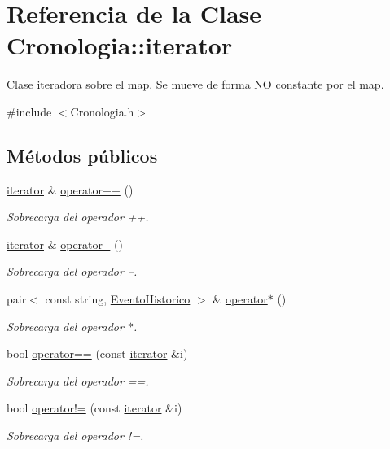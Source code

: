 \hypertarget{classCronologia_1_1iterator}{}\section{Referencia de la Clase Cronologia\+:\+:iterator}
\label{classCronologia_1_1iterator}


Clase iteradora sobre el map. Se mueve de forma NO constante por el map.  




{\ttfamily \#include $<$Cronologia.\+h$>$}

\subsection*{Métodos públicos}
\begin{DoxyCompactItemize}
\item 
\hyperlink{classCronologia_1_1iterator}{iterator} \& \hyperlink{classCronologia_1_1iterator_a706bd624956361f8197c716488b3f287}{operator++} ()
\begin{DoxyCompactList}\small\item\em Sobrecarga del operador ++. \end{DoxyCompactList}\item 
\hyperlink{classCronologia_1_1iterator}{iterator} \& \hyperlink{classCronologia_1_1iterator_af80e6a7382b8c7324df4394a7fe82eda}{operator-\/-\/} ()
\begin{DoxyCompactList}\small\item\em Sobrecarga del operador --. \end{DoxyCompactList}\item 
pair$<$ const string, \hyperlink{classEventoHistorico}{Evento\+Historico} $>$ \& \hyperlink{classCronologia_1_1iterator_a63b19e3195e5344767a4ba679ff83d83}{operator$\ast$} ()
\begin{DoxyCompactList}\small\item\em Sobrecarga del operador $\ast$. \end{DoxyCompactList}\item 
bool \hyperlink{classCronologia_1_1iterator_a126b17bf29145d4bb39c7eb184225ad4}{operator==} (const \hyperlink{classCronologia_1_1iterator}{iterator} \&i)
\begin{DoxyCompactList}\small\item\em Sobrecarga del operador ==. \end{DoxyCompactList}\item 
bool \hyperlink{classCronologia_1_1iterator_a83f40e155be2697a41943a45789ec1ec}{operator!=} (const \hyperlink{classCronologia_1_1iterator}{iterator} \&i)
\begin{DoxyCompactList}\small\item\em Sobrecarga del operador !=. \end{DoxyCompactList}\end{DoxyCompactItemize}
